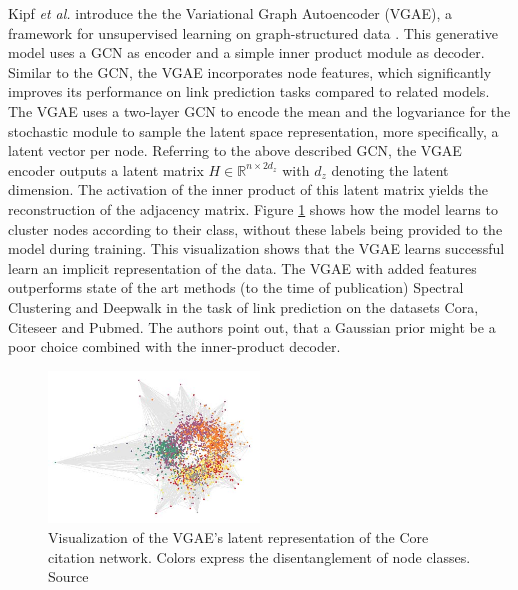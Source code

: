 Kipf \textit{et al.} introduce the the Variational Graph Autoencoder (VGAE), a framework for unsupervised learning on graph-structured data \cite{kipf_variational_2016}. This generative model uses a GCN as encoder and a simple inner product module as decoder. Similar to the GCN, the VGAE incorporates node features, which significantly improves its performance on link prediction tasks compared to related models. The VGAE uses a two-layer GCN to encode the mean and the logvariance for the stochastic module to sample the latent space representation, more specifically, a latent vector per node. Referring to the above described GCN, the VGAE encoder outputs a latent matrix $H \in \mathbb{R}^{n \times 2d_z}$ with $d_z$ denoting the latent dimension. The activation of the inner product of this latent matrix yields the reconstruction of the adjacency matrix. Figure \ref{fig:kipfGVAE} shows how the model learns to cluster  nodes according to their class, without these labels being provided to the model during training.
This visualization shows that the VGAE learns successful learn an implicit representation of the data.
The VGAE with added features outperforms state of the art methods (to the time of publication) Spectral Clustering \cite{tang2011leveraging} and Deepwalk \cite{perozzi2014deepwalk} in the task of link prediction on the datasets Cora, Citeseer and Pubmed. The authors point out, that a Gaussian prior might be a poor choice combined with the inner-product decoder.

\begin{figure}[h]
    \centering
    \includegraphics[width=0.5\textwidth]{data/images/KipGVAE.jpg}
    \caption{Visualization of the VGAE's latent representation of the Core citation network. Colors express the disentanglement of node classes. Source \cite{kipf_variational_2016}}
    \label{fig:kipfGVAE}
\end{figure}



